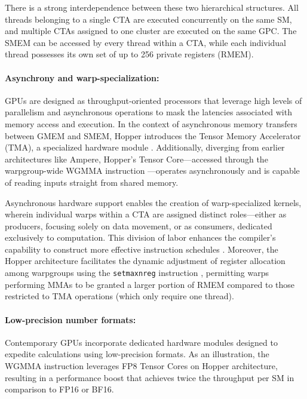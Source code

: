 \begin{enumerate}
There is a strong interdependence between these two hierarchical structures. All threads belonging to a single CTA are executed concurrently on the same SM, and multiple CTAs assigned to one cluster are executed on the same GPC. The SMEM can be accessed by every thread within a CTA, while each individual thread possesses its own set of up to 256 private registers (RMEM).

\paragraph{Asynchrony and warp-specialization:}

GPUs are designed as throughput-oriented processors that leverage high levels of parallelism and asynchronous operations to mask the latencies associated with memory access and execution. In the context of asynchronous memory transfers between GMEM and SMEM, Hopper introduces the Tensor Memory Accelerator (TMA), a specialized hardware module \cite[\S7.29]{cuda}. Additionally, diverging from earlier architectures like Ampere, Hopper's Tensor Core—accessed through the warpgroup-wide WGMMA instruction \cite[\S9.7.14]{ptx}—operates asynchronously and is capable of reading inputs straight from shared memory.

Asynchronous hardware support enables the creation of warp-specialized kernels, wherein individual warps within a CTA are assigned distinct roles—either as producers, focusing solely on data movement, or as consumers, dedicated exclusively to computation. This division of labor enhances the compiler's capability to construct more effective instruction schedules \citep{warp-specialization-2011}. Moreover, the Hopper architecture facilitates the dynamic adjustment of register allocation among warpgroups using the \verb|setmaxnreg| instruction \cite[\S9.7.17.1]{ptx}, permitting warps performing MMAs to be granted a larger portion of RMEM compared to those restricted to TMA operations (which only require one thread).

\paragraph{Low-precision number formats:}
\label{sec:low-precision-gpu}
Contemporary GPUs incorporate dedicated hardware modules designed to expedite calculations using low-precision formats. As an illustration, the WGMMA instruction leverages FP8 Tensor Cores on Hopper architecture, resulting in a performance boost that achieves twice the throughput per SM in comparison to FP16 or BF16.


\end{enumerate}
